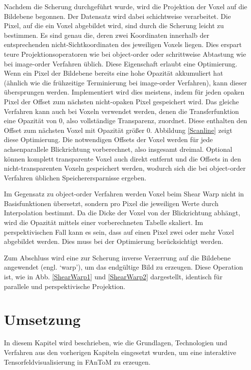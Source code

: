 \documentclass[a4paper,fontsize=12pt,toc=bib,halfparskip]{scrartcl}
\begin{document}
Nachdem die Scherung durchgef\"uhrt wurde, wird die Projektion der Voxel auf die Bildebene begonnen. Der Datensatz wird dabei schichtweise verarbeitet. Die Pixel, auf die ein Voxel abgebildet wird, sind durch die Scherung leicht zu bestimmen. Es sind genau die, deren zwei Koordinaten innerhalb der entsprechenden nicht-Sichtkoordinaten des jeweiligen Voxels liegen. Dies erspart teure Projektionsoperatoren wie bei object-order oder schrittweise Abtastung wie bei image-order Verfahren \"ublich. Diese Eigenschaft erlaubt eine Optimierung. Wenn ein Pixel der Bildebene bereits eine hohe Opazit\"at akkumuliert hat (\"ahnlich wie die fr\"uhzeitige Terminierung bei image-order Verfahren), kann dieser \"ubersprungen werden. Implementiert wird dies meistens, indem f\"ur jeden opaken Pixel der Offset zum n\"achsten nicht-opaken Pixel gespeichert wird. Das gleiche Verfahren kann auch bei Voxeln verwendet werden, denen die Transferfunktion eine Opazit\"at von 0, also vollst\"andige Transparenz, zuordnet. Diese enthalten den Offset zum n\"achsten Voxel mit Opazit\"at gr\"o{\ss}er 0. Abbildung \ref{Scanline} zeigt diese Optimierung. Die notwendigen Offsets der Voxel werden f\"ur jede achsenparallele Blickrichtung vorberechnet, also insgesamt dreimal. Optional k\"onnen komplett transparente Voxel auch direkt entfernt und die Offsets in den nicht-transparenten Voxeln gespeichert werden, wodurch sich die bei object-order Verfahren \"ublichen Speicherersparnisse ergeben. 

Im Gegensatz zu object-order Verfahren werden Voxel beim Shear Warp nicht in Basisfunktionen \"ubersetzt, sondern pro Pixel die jeweiligen Werte durch Interpolation bestimmt. Da die Dicke der Voxel von der Blickrichtung abh\"angt, wird die Opazit\"at mittels einer vorberechneten Tabelle skaliert. Im perspektivischen Fall kann es sein, dass auf einen Pixel zwei oder mehr Voxel abgebildet werden. Dies muss bei der Optimierung ber\"ucksichtigt werden.

Zum Abschluss wird eine zur Scherung inverse Verzerrung auf die Bildebene angewendet (engl. `warp'), um das endg\"ultige Bild zu erzeugen. Diese Operation ist, wie in Abb. \ref{ShearWarp1} und \ref{ShearWarp2} dargestellt, identisch f\"ur parallele und perspektivische Projektion.



\section{Umsetzung}
\label{sec:Umsetzung}
In diesem Kapitel wird beschrieben, wie die Grundlagen, Technologien und Verfahren aus den vorherigen Kapiteln eingesetzt wurden, um eine interaktive Tensorfeldvisualisierung in FAnToM zu erzeugen.
\end{document}

